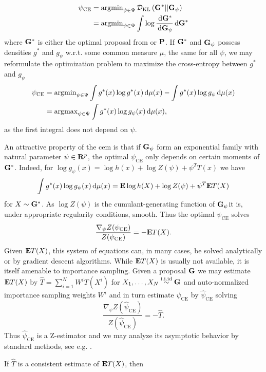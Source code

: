 \begin{align*}
    \psi_{\text{CE}} &= \argmin_{\psi \in \Psi} \Dkl{\G^{\ast}}{\G_{\psi}} \\
    &= \argmin_{\psi \in \Psi} \int \log \frac{\d \G^{\ast}}{\d\G_{\psi}} \d \G^{\ast}
\end{align*}
where $\G^{\ast}$ is either the optimal proposal from  or $\P$. If $\G^{\ast}$ and $\G_{\psi}$ possess densities $g^{\ast}$ and $g_{\psi}$ w.r.t. some common measure $\mu$, the same for all $\psi$, we may reformulate the optimization problem to maximize the cross-entropy between $g^{\ast}$ and $g_{\psi}$
\begin{align*}
    \psi_{\text{CE}} &= \argmin_{\psi \in \Psi} \int  g^{\ast}(x)\log g^{\ast}(x) \d \mu(x) - \int g^{\ast}(x)\log g_{\psi} \d \mu(x) \\
    &= \argmax_{\psi \in \Psi} \int g^{\ast}(x) \log g_{\psi}(x) \d \mu(x),
\end{align*}
as the first integral does not depend on $\psi$.

An attractive property of the \gls{cem} is that if $\G_{\psi}$ form an exponential family with natural parameter $\psi \in \R^{p}$, the optimal $\psi_{\text{CE}}$ only depends on certain moments of $\G^{\ast}$. Indeed, for $\log g_{\psi}(x) = \log h(x) + \log Z(\psi) + \psi^{T} T(x)$ we have 
$$
\int g^{\ast}(x) \log g_{\psi}(x) \d \mu(x) = \E \log h(X) + \log Z(\psi) + \psi^{T} \E T(X)
$$
for $X \sim \G^{\ast}$. As $\log Z(\psi)$ is the cumulant-generating function of $\G_{\psi}$it is, under appropriate regularity conditions, smooth. Thus the optimal $\psi_{\text{CE}}$ solves
$$
\frac{\nabla_{\psi}Z(\psi_{\text{CE}})}{Z(\psi_{\text{CE}})} = - \E T(X).
$$
Given $\E T(X)$, this system of equations can, in many cases, be solved analytically or by gradient descent algorithms. While $\E T(X)$ is usually not available, it is itself amenable to importance sampling. Given a proposal $\G$ we may estimate $\E T(X)$ by $\hat T = \sum_{i = 1}^{N} W^{i} T(X^{i})$ for $X_{1}, \dots, X_{N} \iid \G$ and auto-normalized importance sampling weights $W^{i}$ and in turn estimate $\psi_{\text{CE}}$ by $\hat \psi_{\text{CE}}$ solving
$$
\frac{\nabla_{\psi}Z(\hat\psi_{\text{CE}})}{Z(\hat\psi_{\text{CE}})} = - \hat T.
$$
Thus $\hat \psi_{\text{CE}}$ is a Z-estimator and we may analyze its asymptotic behavior by standard methods, see e.g. \cite[Chapter 5]{VanderVaart2000Asymptotic}. 
\begin{theorem}
    If $\hat T$ is a consistent estimate of $\E T(X)$, then 
\end{theorem}


